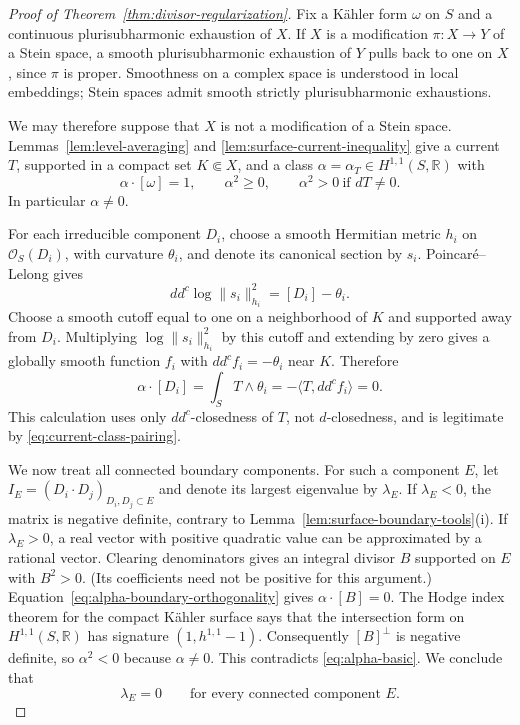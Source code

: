 \documentclass[11pt]{amsart}
\theoremstyle{definition}
\theoremstyle{remark}
\numberwithin{equation}{section}
\newcommand{\ddc}{dd^c}
\begin{document}
\begin{proof}[Proof of Theorem~\ref{thm:divisor-regularization}]
Fix a K\"ahler form $\omega$ on $S$ and a continuous
plurisubharmonic exhaustion of $X$.  If $X$ is a modification
$\pi:X\to Y$ of a Stein space, a smooth plurisubharmonic
exhaustion of $Y$ pulls back to one on $X$, since $\pi$ is proper.
Smoothness on a complex space is understood in local embeddings;
Stein spaces admit smooth strictly plurisubharmonic exhaustions.

We may therefore suppose that $X$ is not a modification of a Stein
space.  Lemmas~\ref{lem:level-averaging} and
\ref{lem:surface-current-inequality} give a current $T$, supported
in a compact set $K\Subset X$, and a class
$\alpha=\alpha_T\in H^{1,1}(S,\mathbb R)$ with
\begin{equation}
\label{eq:alpha-basic}
 \alpha\cdot[\omega]=1,\qquad
 \alpha^2\geq0,\qquad
 \alpha^2>0\ \text{if }dT\ne0.
\end{equation}
In particular $\alpha\ne0$.

For each irreducible component $D_i$, choose a smooth Hermitian
metric $h_i$ on $\mathcal O_S(D_i)$, with curvature $\theta_i$,
and denote its canonical section by $s_i$.  Poincar\'e--Lelong gives
\[
 \ddc\log\|s_i\|_{h_i}^{2}=[D_i]-\theta_i.
\]
Choose a smooth cutoff equal to one on a neighborhood of $K$ and
supported away from $D_i$.  Multiplying $\log\|s_i\|_{h_i}^{2}$
by this cutoff and extending by zero gives a globally smooth
function $f_i$ with $\ddc f_i=-\theta_i$ near $K$.  Therefore
\begin{equation}
\label{eq:alpha-boundary-orthogonality}
 \alpha\cdot[D_i]
   =\int_S T\wedge\theta_i
   =-\langle T,\ddc f_i\rangle
   =0.
\end{equation}
This calculation uses only $dd^c$-closedness of $T$, not
$d$-closedness, and is legitimate by
\eqref{eq:current-class-pairing}.

We now treat all connected boundary components.  For such a component
$E$, let $I_E=(D_i\cdot D_j)_{D_i,D_j\subset E}$ and denote its
largest eigenvalue by $\lambda_E$.  If $\lambda_E<0$, the matrix
is negative definite, contrary to
Lemma~\ref{lem:surface-boundary-tools}\textup{(i)}.  If
$\lambda_E>0$, a real vector with positive quadratic value can
be approximated by a rational vector.  Clearing denominators gives
an integral divisor $B$ supported on $E$ with $B^2>0$.  (Its
coefficients need not be positive for this argument.)
Equation~\eqref{eq:alpha-boundary-orthogonality} gives
$\alpha\cdot[B]=0$.  The Hodge index theorem for the compact
K\"ahler surface says that the intersection form on
$H^{1,1}(S,\mathbb R)$ has signature $(1,h^{1,1}-1)$.
Consequently $[B]^\perp$ is negative definite, so
$\alpha^2<0$ because $\alpha\ne0$.  This contradicts
\eqref{eq:alpha-basic}.  We conclude that
\begin{equation}
\label{eq:boundary-top-eigenvalue}
 \lambda_E=0\qquad\text{for every connected component }E.
\end{equation}


\end{proof}
\end{document}
